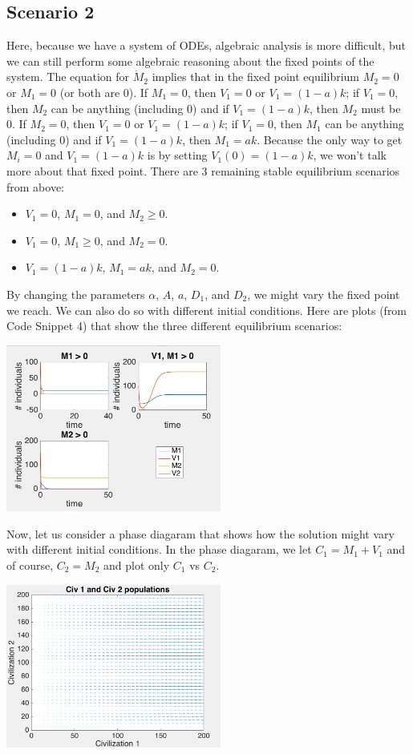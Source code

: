 \documentclass[12pt]{article}
\begin{document}
\subsection{Scenario 2}
Here, because we have a system of ODEs, algebraic analysis is more difficult, but we can still perform some algebraic reasoning about the fixed points of the system. The equation for $\dot M_2$ implies that in the fixed point equilibrium $M_2 = 0$ or $M_1 = 0$ (or both are 0). If $M_1=0$, then $V_1=0$ or $V_1=(1-a)k$; if $V_1 = 0$, then $M_2$ can be anything (including 0) and if $V_1 = (1-a)k$, then $M_2$ must be 0. If $M_2 = 0$, then $V_1=0$ or $V_1=(1-a)k$; if $V_1 = 0$, then $M_1$ can be anything (including 0) and if $V_1 = (1-a)k$, then $M_1 = ak$. Because the only way to get $M_i = 0$ and $V_1 = (1-a)k$ is by setting $V_1(0) = (1-a)k$, we won't talk more about that fixed point. There are 3 remaining stable equilibrium scenarios from above:
\begin{itemize}
\item $V_1 = 0$, $M_1 = 0$, and $M_2 \geq 0$.
\item $V_1 =0$, $M_1 \geq 0$, and $M_2 = 0$.
\item $V_1 = (1-a)k$, $M_1 = ak$, and $M_2 = 0$.
\end{itemize}

By changing the parameters $\alpha$, $A$, $a$, $D_1$, and $D_2$, we might vary the fixed point we reach. We can also do so with different initial conditions. Here are plots (from Code Snippet 4) that show the three different equilibrium scenarios:
\begin{center}
\includegraphics[width=200pt]{graph_ext1}
\end{center}

Now, let us consider a phase diagaram that shows how the solution might vary with different initial conditions. In the phase diagaram, we let $C_1 = M_1 + V_1$ and of course, $C_2 = M_2$ and plot only $C_1$ vs $C_2$.

\begin{center}
\includegraphics[width=200pt]{phase_ext1}
\end{center}
\end{document}
